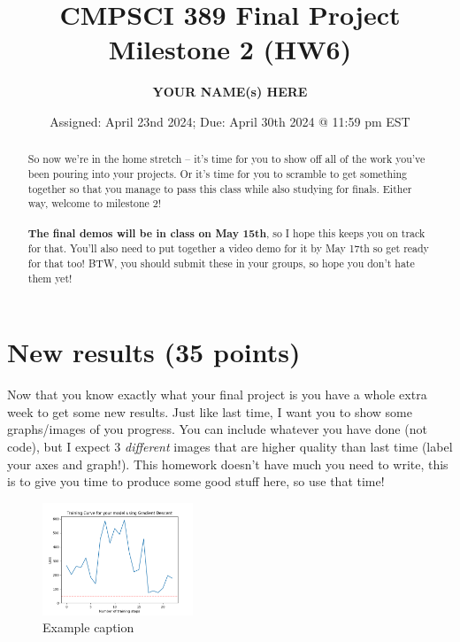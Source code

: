 \documentclass{article}
\begin{document}
\title{CMPSCI 389 Final Project Milestone 2 (HW6)}
\author{\textbf{YOUR NAME(s) HERE}}
\date{Assigned: April 23nd 2024; Due: April 30th 2024 @ 11:59 pm EST}

\maketitle

\begin{abstract}
    So now we're in the home stretch -- it's time for you to show off all of the work you've been pouring into your projects. Or it's time for you to scramble to get something together so that you manage to pass this class while also studying for finals. Either way, welcome to milestone 2! \\ \\
    \textbf{The final demos will be in class on May 15th}, so I hope this keeps you on track for that. You'll also need to put together a video demo for it by May 17th so get ready for that too! BTW, you should submit these in your groups, so hope you don't hate them yet!
    
\end{abstract}

\section{New results (35 points)}

Now that you know exactly what your final project is you have a whole extra week to get some new results. Just like last time, I want you to show some graphs/images of you progress. You can include whatever you have done (not code), but I expect 3 \textit{different} images that are higher quality than last time (label your axes and graph!). This homework doesn't have much you need to write, this is to give you time to produce some good stuff here, so use that time!


\begin{figure}[htb]
    \centering
    \includegraphics[width=0.4\textwidth]{Figs/Example training.png}
    \caption{ Example caption}
    \label{fig:net}
\end{figure}
\end{document}
